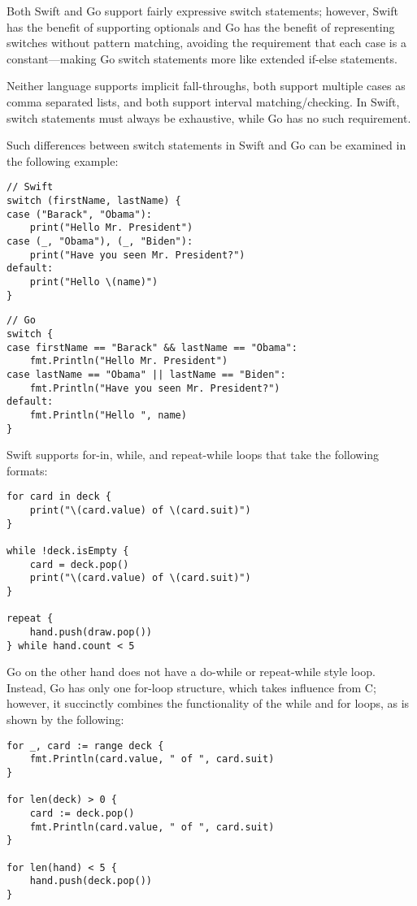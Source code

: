 \documentclass[letterpaper]{article}
\begin{document}
Both Swift and Go support fairly expressive switch statements; however, Swift has the benefit of supporting optionals and Go has the benefit of representing switches without pattern matching, avoiding the requirement that each case is a constant—making Go switch statements more like extended if-else statements.

Neither language supports implicit fall-throughs, both support multiple cases as comma separated lists, and both support interval matching/checking. In Swift, switch statements must always be exhaustive, while Go has no such requirement.

Such differences between switch statements in Swift and Go can be examined in the following example:

\begin{verbatim}
// Swift
switch (firstName, lastName) {
case ("Barack", "Obama"):
    print("Hello Mr. President")
case (_, "Obama"), (_, "Biden"):
    print("Have you seen Mr. President?")
default:
    print("Hello \(name)")
}
\end{verbatim}

\begin{verbatim}
// Go
switch {
case firstName == "Barack" && lastName == "Obama":
    fmt.Println("Hello Mr. President")
case lastName == "Obama" || lastName == "Biden":
    fmt.Println("Have you seen Mr. President?")
default:
    fmt.Println("Hello ", name)
}
\end{verbatim}

Swift supports for-in, while, and repeat-while loops that take the following formats:

\begin{verbatim}
for card in deck {
    print("\(card.value) of \(card.suit)")
}

while !deck.isEmpty {
    card = deck.pop()
    print("\(card.value) of \(card.suit)")
}

repeat {
    hand.push(draw.pop())
} while hand.count < 5
\end{verbatim}

Go on the other hand does not have a do-while or repeat-while style loop. Instead, Go has only one for-loop structure, which takes influence from C; however, it succinctly combines the functionality of the while and for loops, as is shown by the following:

\begin{verbatim}
for _, card := range deck {
    fmt.Println(card.value, " of ", card.suit)
}

for len(deck) > 0 {
    card := deck.pop()
    fmt.Println(card.value, " of ", card.suit)
}

for len(hand) < 5 {
    hand.push(deck.pop())
}
\end{verbatim}
\end{document}
